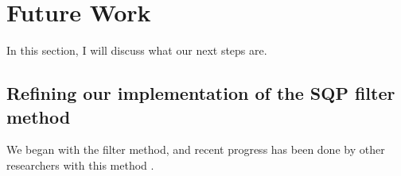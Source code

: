 \documentclass{article}
\begin{document}



\section{Future Work}

In this section, I will discuss what our next steps are.

\subsection{Refining our implementation of the SQP filter method}
We began with the filter method, and recent progress has been done by other researchers with this method \cite{DUMMY:Brekelman}.
\end{document}
